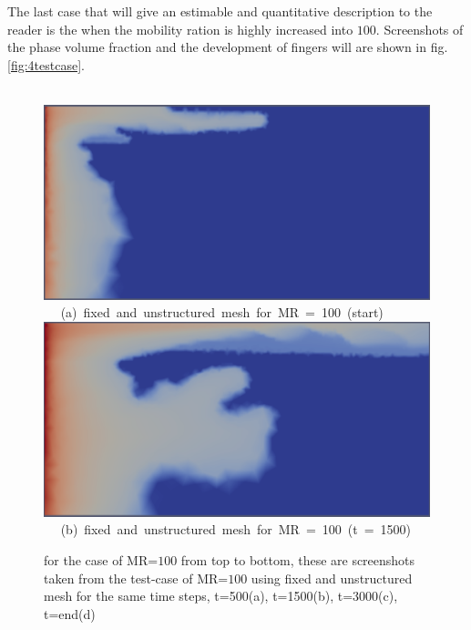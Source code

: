 \documentclass[preprint,authoryear,12pt]{elsarticle}
\begin{document}
The last case that will give an estimable and quantitative description to the reader is the when the mobility ration is highly increased into $100$. Screenshots of the phase volume fraction and the development of fingers will are shown in fig.\ref{fig:4testcase}.


\begin{figure}[h]
\vbox{
\hbox{\hspace{3.5cm}
\includegraphics[width=.5\textwidth]{./Pics1/mr100_fixed/mr100_fixed_500.pdf} 
}
\vspace{0.0cm}
\hbox{\hspace{5.0cm} (a) fixed and unstructured mesh for MR = 100 (start)   
}
\hbox{\hspace{3.5cm}
\includegraphics[width=.5\textwidth]{./Pics1/mr100_fixed/mr100_fixed_1500.pdf}
}
\vspace{0.0cm}
\hbox{\hspace{5.0cm} (b) fixed and unstructured mesh for MR = 100 (t = 1500)   
}
}     
\caption{for the case of MR=$100$ from top to bottom, these are screenshots taken from the test-case of MR=$100$ using fixed and unstructured mesh for the same time steps, t=500(a), t=1500(b), t=3000(c), t=end(d) }
\label{fig:4testcase_a}
\end{figure}
\end{document}
